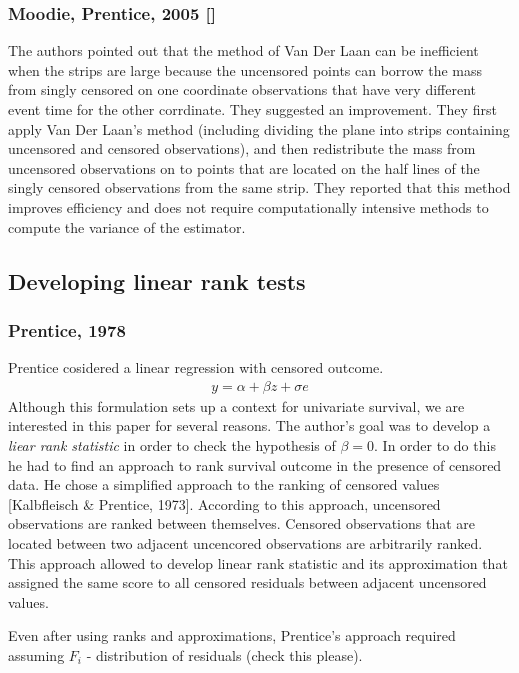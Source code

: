 \documentclass[]{article}
\begin{document}
\subsubsection{Moodie, Prentice, 2005 [\cite{moodie2005adjustment}]}
The authors pointed out that the method of Van Der Laan can be inefficient when the strips are large because the uncensored points can borrow the mass from singly censored on one coordinate observations that have very different event time for the other corrdinate. They suggested an improvement. They first apply Van Der Laan's method (including dividing the plane into strips containing uncensored and censored observations), and then redistribute the mass from uncensored observations on to points that are located on the half lines of the singly censored observations from the same strip. They reported that this method improves efficiency and does not require computationally intensive methods to compute the variance of the estimator.


\subsection{Developing linear rank tests}

\subsubsection{Prentice, 1978}
Prentice cosidered a linear regression with censored outcome.
	$$
	\begin{aligned}
		y = \alpha + \beta z + \sigma e
	\end{aligned}
	$$
Although this formulation sets up a context for univariate survival, we are interested in this paper for several reasons. The author's goal was to develop a \emph{liear rank statistic} in order to check the hypothesis of $\beta = 0$. In order to do this he had to find an approach to rank survival outcome in the presence of censored data. He chose a simplified approach to the ranking of censored values [Kalbfleisch \& Prentice, 1973]. According to this approach, uncensored observations are ranked between themselves. Censored observations that are located between two adjacent uncencored observations are arbitrarily ranked. This approach allowed to develop linear rank statistic and its approximation that assigned the same score to all censored residuals between adjacent uncensored values.

Even after using ranks and approximations, Prentice's approach required assuming $F_i$ - distribution of residuals (check this please).
\end{document}
